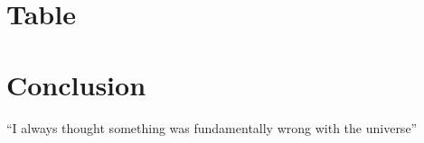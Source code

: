\documentclass[apj,twocolumn]{aastex631}
\begin{document}

\section{Table}



\section{Conclusion}
``I always thought something was fundamentally wrong with the universe''

%
%
\clearpage

\end{document}
